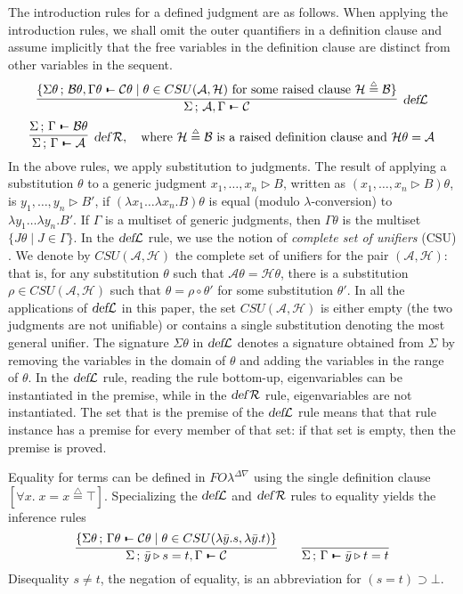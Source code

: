 \documentclass{acmtrans2m}
\def\Ascr{{\mathcal A}}
\def\Bscr{{\mathcal B}}
\def\Cscr{{\mathcal C}}
\def\Hscr{{\mathcal H}}
\def\relbar{\mathrel{\smash-}}
\def\joinrelm{\mathrel{\mkern-3.2mu}}
\def\tailpiece{\kern 1pt\vrule height 1ex width 0.3ex depth -.25ex}
\def\seqsym{\mathrel{\tailpiece\joinrelm\relbar}}
\newcommand{\FOL   }{FO\lambda}
\newcommand{\FOLDNb}{\FOL^{\Delta\nabla}}
\newcommand{\Judg}[2]{#1\triangleright#2}
\newcommand{\NSeq}[3]{#1\,;\,#2 \seqsym #3}
\newcommand{\defL}{\hbox{\sl def}{\cal L}}
\newcommand{\defR}{\hbox{\sl def\/{}}{\cal R}}
\newcommand{\defeq}{\mathrel{\stackrel{{\scriptscriptstyle\triangle}}{=}}}
\newcommand{\oimp}{\supset}
\begin{document}
The introduction rules for a defined judgment are as follows.
When applying the introduction rules, we shall omit the 
outer quantifiers in a definition clause 
and assume implicitly that the free variables in the definition
clause are distinct from other variables in the sequent.
$$
\infer[\defL]
      {\NSeq{\Sigma}{\Ascr,\Gamma}{\Cscr}}
      {\{\NSeq{\Sigma\theta}
              {\Bscr\theta,\Gamma\theta}{\Cscr\theta}
       \;\vert\; \theta \in CSU(\Ascr,\Hscr) \mbox{ for some raised clause 
       $\Hscr \defeq \Bscr$}\}}
$$
$$       
\infer[\defR, \mbox{\quad where\ } \Hscr \defeq \Bscr \mbox{ is a raised definition clause and }
\Hscr\theta = \Ascr]
      {\NSeq{\Sigma}{\Gamma}{\Ascr}}
      {\NSeq{\Sigma}{\Gamma}{\Bscr\theta}}       
$$
In the above rules, we apply substitution to judgments.
The result of applying a substitution $\theta$ to a generic judgment
$\Judg{x_1,\ldots,x_n}{B}$, written as
$(\Judg{x_1,\ldots,x_n}{B})\theta$, is
$\Judg{y_1,\ldots,y_n}{B'}$, if $(\lambda x_1\ldots\lambda
x_n.B)\theta$ is equal (modulo $\lambda$-conversion) to $\lambda
y_1\ldots\lambda y_n.B'$.  If $\Gamma$ is a multiset of generic
judgments, then $\Gamma\theta$ is the multiset $\{J\theta\mid
J\in\Gamma\}$.  
In the $\defL$ rule, we use the notion of {\em complete set of
unifiers} (CSU) \cite{huet75tcs}. We denote by $CSU(\Ascr, \Hscr)$ the
complete set of unifiers for the pair $(\Ascr, \Hscr)$: that is, for
any substitution $\theta$ such that $\Ascr\theta = \Hscr\theta$, there
is a substitution $\rho \in CSU(\Ascr,\Hscr)$ such that $\theta = \rho
\circ \theta'$ for some substitution $\theta'$.  In all the
applications of $\defL$ in this paper, the set $CSU(\Ascr, \Hscr)$ is
either empty (the two judgments are not unifiable) or contains a
single substitution denoting the most general unifier.  The signature
$\Sigma\theta$ in $\defL$ denotes a signature obtained from $\Sigma$
by removing the variables in the domain of $\theta$ and adding the
variables in the range of $\theta$.  In the $\defL$ rule, reading the
rule bottom-up, eigenvariables can be instantiated in the premise,
while in the $\defR$ rule, eigenvariables are not instantiated.  The
set that is the premise of the $\defL$ rule means that that rule
instance has a premise for every member of that set: if that set is
empty, then the premise is proved.

Equality for terms can be defined in $\FOLDNb$ using the single
definition clause $[\forall x.\;x = x \defeq \top]$.
Specializing the $\defL$ and $\defR$ rules to equality yields the
inference rules
$$
 \infer{\NSeq{\Sigma}{\Judg{\bar y}{s=t},\Gamma}{\Cscr}}
       {\{\NSeq{\Sigma\theta}{\Gamma\theta}{\Cscr\theta}
       \;\vert\; \theta \in CSU(\lambda\bar y.s, \lambda\bar y.t)\}}
  \qquad
  \infer{\NSeq{\Sigma}{\Gamma}{\Judg{\bar y}{t=t}}}{}
$$
Disequality $s\neq t$, the negation of equality, is an abbreviation
for $(s = t)\oimp \bot$.
\end{document}

